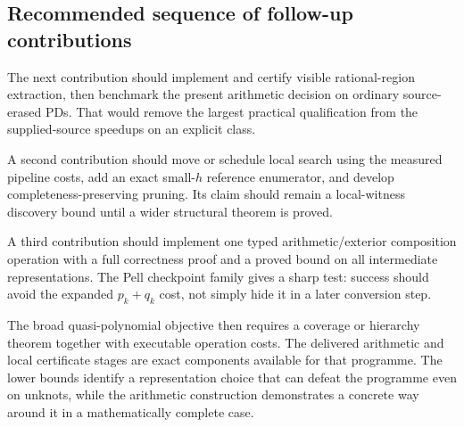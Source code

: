 \subsection{Recommended sequence of follow-up contributions}

The next contribution should implement and certify visible rational-region
extraction, then benchmark the present arithmetic decision on ordinary
source-erased PDs. That would remove the largest practical qualification
from the supplied-source speedups on an explicit class.

A second contribution should move or schedule local search using the
measured pipeline costs, add an exact small-\(h\) reference enumerator,
and develop completeness-preserving pruning. Its claim should remain a
local-witness discovery bound until a wider structural theorem is proved.

A third contribution should implement one typed arithmetic/exterior
composition operation with a full correctness proof and a proved bound on
all intermediate representations. The Pell checkpoint family gives a sharp
test: success should avoid the expanded \(p_k+q_k\) cost, not simply hide
it in a later conversion step.

The broad quasi-polynomial objective then requires a coverage or hierarchy
theorem together with executable operation costs. The delivered arithmetic
and local certificate stages are exact components available for that
programme. The lower bounds identify a representation choice that can
defeat the programme even on unknots, while the arithmetic construction
demonstrates a concrete way around it in a mathematically complete case.
